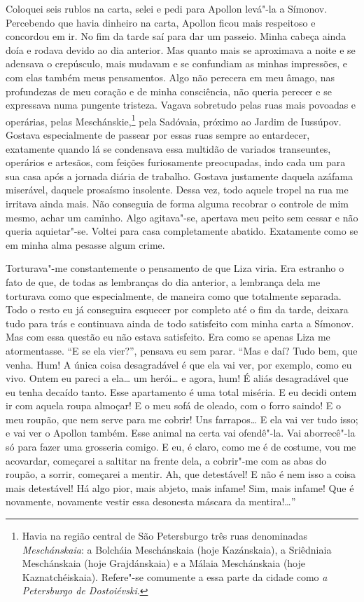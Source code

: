 Coloquei seis rublos na carta, selei e pedi para Apollon levá"-la a
Símonov. Percebendo que havia dinheiro na carta, Apollon ficou mais
respeitoso e concordou em ir. No fim da tarde saí para dar um passeio.
Minha cabeça ainda doía e rodava devido ao dia anterior. Mas quanto
mais se aproximava a noite e se adensava o crepúsculo, mais mudavam e
se confundiam as minhas impressões, e com elas também meus pensamentos.
Algo não perecera em meu âmago, nas profundezas de meu coração e de
minha consciência, não queria perecer e se expressava numa pungente
tristeza. Vagava sobretudo pelas ruas mais povoadas e operárias, pelas
Meschánskie,\footnote{ Havia na região central de São Petersburgo três
ruas denominadas \textit{Meschánskaia}: a Bolcháia Meschánskaia (hoje
Kazánskaia), a Sriêdniaia Meschánskaia (hoje Grajdánskaia) e a Málaia
Meschánskaia (hoje Kaznatchéiskaia). Refere"-se comumente a essa parte
da cidade como \textit{a Petersburgo de Dostoiévski}.} pela Sadóvaia, próximo
ao Jardim de Iussúpov. Gostava especialmente de passear por essas ruas
sempre ao entardecer, exatamente quando lá se condensava essa multidão
de variados transeuntes, operários e artesãos, com feições furiosamente
preocupadas, indo cada um para sua casa após a jornada diária de
trabalho. Gostava justamente daquela azáfama miserável, daquele
prosaísmo insolente. Dessa vez, todo aquele tropel na rua me irritava
ainda mais. Não conseguia de forma alguma recobrar o controle de mim
mesmo, achar um caminho. Algo agitava"-se, apertava meu peito sem cessar
e não queria aquietar"-se. Voltei para casa completamente abatido.
Exatamente como se em minha alma pesasse algum crime.

Torturava"-me constantemente o pensamento de que Liza viria. Era estranho
o fato de que, de todas as lembranças do dia anterior, a lembrança dela
me torturava como que especialmente, de maneira como que totalmente
separada. Todo o resto eu já conseguira esquecer por completo até o fim
da tarde, deixara tudo para trás e continuava ainda de todo satisfeito
com minha carta a Símonov. Mas com essa questão eu não estava
satisfeito. Era como se apenas Liza me atormentasse. ``E se ela vier?'',
pensava eu sem parar. ``Mas e daí? Tudo bem, que venha. Hum! A única
coisa desagradável é que ela vai ver, por exemplo, como eu vivo. Ontem
eu pareci a ela\ldots{} um herói\ldots{} e agora, hum! É aliás desagradável que eu
tenha decaído tanto. Esse apartamento é uma total miséria. E eu decidi
ontem ir com aquela roupa almoçar! E o meu sofá de oleado, com o forro
saindo! E o meu roupão, que nem serve para me cobrir! Uns farrapos\ldots{} E
ela vai ver tudo isso; e vai ver o Apollon também. Esse animal na certa
vai ofendê"-la. Vai aborrecê"-la só para fazer uma grosseria comigo. E
eu, é claro, como me é de costume, vou me acovardar, começarei a
saltitar na frente dela, a cobrir"-me com as abas do roupão, a sorrir,
começarei a mentir. Ah, que detestável! E não é nem isso a coisa mais
detestável! Há algo pior, mais abjeto, mais infame! Sim, mais infame!
Que é novamente, novamente vestir essa desonesta máscara da
mentira!\ldots{}''

